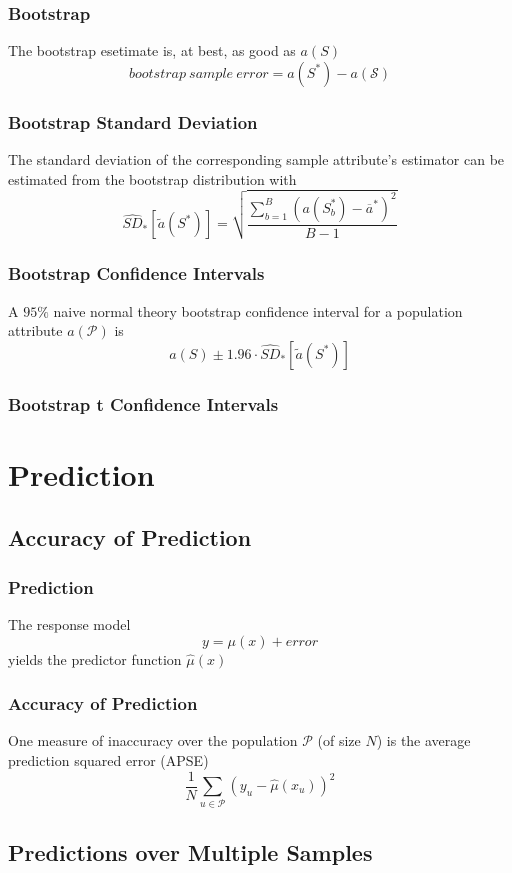 \documentclass[11pt]{article}
\begin{document}
\subsubsection{Bootstrap}
The bootstrap esetimate is, at best, as good as $a(S)$ 
\[bootstrap\ sample\ error = a(S^*) - a(\mathcal{S})\]
\subsubsection*{Bootstrap Standard Deviation}
The standard deviation of the corresponding sample attribute's estimator can be estimated from the bootstrap distribution with 
\[\hat{SD}_*[\tilde{a}(S^*)] = \sqrt{\frac{\sum_{b=1}^{B}(a(S^*_b)-\overline{a}^*)^2}{B-1}}\]
\subsubsection{Bootstrap Confidence Intervals}
A $95\%$ naive normal theory bootstrap confidence interval for a population attribute $a(\mathcal{P})$ is 
\[a(S)\pm 1.96\cdot \hat{SD}_*[\tilde{a}(S^*)]\]
\subsubsection{Bootstrap t Confidence Intervals}



\newpage 
\section{Prediction}
\subsection{Accuracy of Prediction}
\subsubsection*{Prediction}
The response model \[y = \mu(x) + error\]
yields the predictor function $\hat{\mu}(x)$
\subsubsection*{Accuracy of Prediction}
One measure of inaccuracy over the population $\mathcal{P}$ (of size $N$) is the average prediction squared error (APSE)
\[\frac{1}{N}\sum_{u\in\mathcal{P}}(y_u - \hat{\mu}(x_u))^2\]



\subsection{Predictions over Multiple Samples}
\end{document}
